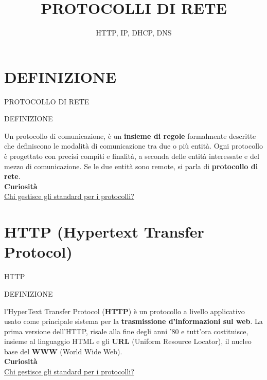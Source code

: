 \documentclass[aspectratio=1610]{beamer}
\title{PROTOCOLLI DI RETE}
\subtitle{HTTP, IP, DHCP, DNS}
\date{}
\institute{\textit{
        Fonti:
        \begin{itemize}
            \item[-] \href{https://it.wikipedia.org/wiki/Protocollo_di_rete}{Wikipedia}
            \item[-] \href{https://www.forbes.com/advisor/it/business/software/ipv6-protocollo-vpn/}{Forbes}
        \end{itemize}
    }
}
\begin{document}
\begin{frame}
    \titlepage
\end{frame}

\section{DEFINIZIONE}

\begin{frame}{PROTOCOLLO DI RETE}
    \begin{alertblock}{DEFINIZIONE}
        \begin{minipage}{0.98\linewidth}
            \justifying
            Un protocollo di comunicazione, è un \textbf{insieme di regole} formalmente descritte 
            che definiscono le modalità di comunicazione tra due o più entità. Ogni protocollo 
            è progettato con precisi compiti e finalità, a seconda delle entità interessate e 
            del mezzo di comunicazione. Se le due entità sono remote, si parla di \textbf{protocollo di rete}.\\
            \bigskip
            \tiny{\textbf{Curiosità}}\\
            \tiny{\href{https://www.w3.org/}{Chi gestisce gli standard per i protocolli?}}           
        \end{minipage}
    \end{alertblock}
\end{frame}

\section{HTTP (Hypertext Transfer Protocol)}

\begin{frame}{HTTP}
    \begin{alertblock}{DEFINIZIONE}
        \begin{minipage}{0.98\linewidth}
            \justifying
            l'HyperText Transfer Protocol (\textbf{HTTP}) è un protocollo a livello applicativo 
            usato come principale sistema per la \textbf{trasmissione d'informazioni sul web}. La prima 
            versione dell'HTTP, risale alla fine degli anni '80 e tutt'ora costituisce, insieme al 
            linguaggio HTML e gli \textbf{URL} (Uniform Resource Locator), il nucleo base 
            del \textbf{WWW} (World Wide Web).\\
            \bigskip
            \tiny{\textbf{Curiosità}}\\
            \tiny{\href{https://www.w3.org/}{Chi gestisce gli standard per i protocolli?}}           
        \end{minipage}
    \end{alertblock}
\end{frame}
\end{document}
